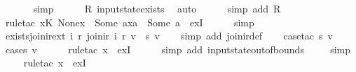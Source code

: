 \begin{isabellebody}
\ \ \ \ \ \isamarkupfalse%
\ simp\isanewline
\ \ \ \ \isamarkupfalse%
\ R\ input{}state{\isacharunderscore}exists\ \isamarkupfalse%
\ auto{\isacharbrackleft}{}{\isacharbrackright}\isanewline
\ \ \ \ \isamarkupfalse%
\ {\isacharparenleft}simp\ add{\isacharcolon}\ R{\isacharparenright}\isanewline
\ \ \ \ \isamarkupfalse%
\ {\isacharparenleft}rule{\isacharunderscore}tac\ x{\isacharequal}{\isachardoublequoteopen}{\isacharparenleft}K{\isachardollar}\ None{\isacharparenright}{\isacharparenleft}x{}\ {\isachardollar}{\isacharcolon}{\isacharequal}\ Some\ a{\isacharparenright}{\isacharparenleft}x{}a\ {\isachardollar}{\isacharcolon}{\isacharequal}\ Some\ a{\isacharprime}{\isacharparenright}{\isachardoublequoteclose}\ \ exI{\isacharparenright}\isanewline
\ \ \ \ \isamarkupfalse%
\ simp\isanewline
{}\isamarkupfalse%
%
\endisatagproof
{\isafoldproof}%
%
\isadelimproof
\isanewline
%
\endisadelimproof
\isanewline
{}\isamarkupfalse%
\ exists{\isacharunderscore}join{\isacharunderscore}ir{\isacharunderscore}ext{\isacharcolon}\ {\isachardoublequoteopen}{\isasymexists}i\ r{\isachardot}\ join{\isacharunderscore}ir\ i\ r\ v\ {\isacharequal}\ s\ v{\isachardoublequoteclose}\isanewline
%
\isadelimproof
\ \ %
\endisadelimproof
%
\isatagproof
{}\isamarkupfalse%
\ {\isacharparenleft}simp\ add{\isacharcolon}\ join{\isacharunderscore}ir{\isacharunderscore}def{\isacharparenright}\isanewline
\ \ \isamarkupfalse%
\ {\isacharparenleft}case{\isacharunderscore}tac\ {\isachardoublequoteopen}s\ v{\isachardoublequoteclose}{\isacharparenright}\isanewline
\ \ \ \isamarkupfalse%
\ {\isacharparenleft}cases\ v{\isacharparenright}\isanewline
\ \ \ \ \isamarkupfalse%
\ {\isacharparenleft}rule{\isacharunderscore}tac\ x{\isacharequal}{\isachardoublequoteopen}{\isacharbrackleft}{\isacharbrackright}{\isachardoublequoteclose}\ \ exI{\isacharparenright}\isanewline
\ \ \ \ \isamarkupfalse%
\ {\isacharparenleft}simp\ add{\isacharcolon}\ input{}state{\isacharunderscore}out{\isacharunderscore}of{\isacharunderscore}bounds{\isacharparenright}\isanewline
\ \ \ \isamarkupfalse%
\ simp\isanewline
\ \ \ \isamarkupfalse%
\ {\isacharparenleft}rule{\isacharunderscore}tac\ x{\isacharequal}{\isachardoublequoteopen}{\isacharless}{\isachargreater}{\isachardoublequoteclose}\ \ exI{\isacharparenright}\isanewline

\end{isabellebody}

